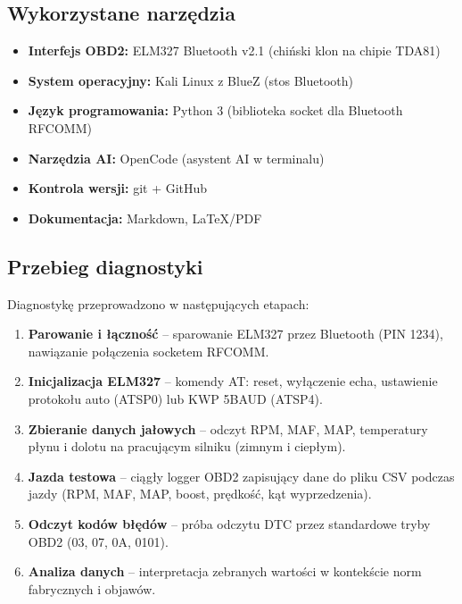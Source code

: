 \documentclass[12pt,a4paper]{article}
\begin{document}
\subsection{Wykorzystane narzędzia}

\begin{itemize}
    \item \textbf{Interfejs OBD2:} ELM327 Bluetooth v2.1 (chiński klon na chipie TDA81)
    \item \textbf{System operacyjny:} Kali Linux z BlueZ (stos Bluetooth)
    \item \textbf{Język programowania:} Python 3 (biblioteka socket dla Bluetooth RFCOMM)
    \item \textbf{Narzędzia AI:} OpenCode (asystent AI w terminalu)
    \item \textbf{Kontrola wersji:} git + GitHub
    \item \textbf{Dokumentacja:} Markdown, LaTeX/PDF
\end{itemize}

\subsection{Przebieg diagnostyki}

Diagnostykę przeprowadzono w następujących etapach:

\begin{enumerate}
    \item \textbf{Parowanie i łączność} – sparowanie ELM327 przez Bluetooth (PIN 1234),
          nawiązanie połączenia socketem RFCOMM.
    \item \textbf{Inicjalizacja ELM327} – komendy AT: reset, wyłączenie echa, ustawienie
          protokołu auto (ATSP0) lub KWP 5BAUD (ATSP4).
    \item \textbf{Zbieranie danych jałowych} – odczyt RPM, MAF, MAP, temperatury płynu
          i dolotu na pracującym silniku (zimnym i ciepłym).
    \item \textbf{Jazda testowa} – ciągły logger OBD2 zapisujący dane do pliku CSV
          podczas jazdy (RPM, MAF, MAP, boost, prędkość, kąt wyprzedzenia).
    \item \textbf{Odczyt kodów błędów} – próba odczytu DTC przez standardowe
          tryby OBD2 (03, 07, 0A, 0101).
    \item \textbf{Analiza danych} – interpretacja zebranych wartości w kontekście
          norm fabrycznych i objawów.
\end{enumerate}
\end{document}
